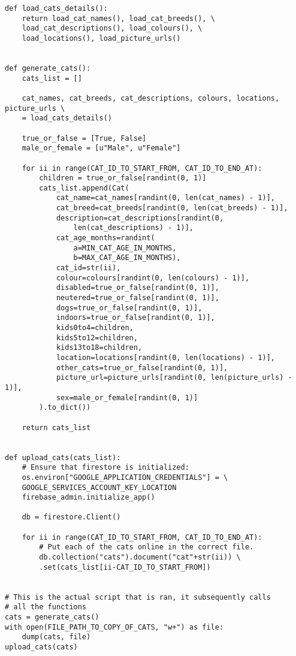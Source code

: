 \begin{verbatim}
def load_cats_details():
    return load_cat_names(), load_cat_breeds(), \
    load_cat_descriptions(), load_colours(), \
    load_locations(), load_picture_urls()


def generate_cats():
    cats_list = []

    cat_names, cat_breeds, cat_descriptions, colours, locations, picture_urls \
    = load_cats_details()

    true_or_false = [True, False]
    male_or_female = [u"Male", u"Female"]

    for ii in range(CAT_ID_TO_START_FROM, CAT_ID_TO_END_AT):
        children = true_or_false[randint(0, 1)]
        cats_list.append(Cat(
            cat_name=cat_names[randint(0, len(cat_names) - 1)],
            cat_breed=cat_breeds[randint(0, len(cat_breeds) - 1)],
            description=cat_descriptions[randint(0,
                len(cat_descriptions) - 1)],
            cat_age_months=randint(
                a=MIN_CAT_AGE_IN_MONTHS,
                b=MAX_CAT_AGE_IN_MONTHS),
            cat_id=str(ii),
            colour=colours[randint(0, len(colours) - 1)],
            disabled=true_or_false[randint(0, 1)],
            neutered=true_or_false[randint(0, 1)],
            dogs=true_or_false[randint(0, 1)],
            indoors=true_or_false[randint(0, 1)],
            kids0to4=children,
            kids5to12=children,
            kids13to18=children,
            location=locations[randint(0, len(locations) - 1)],
            other_cats=true_or_false[randint(0, 1)],
            picture_url=picture_urls[randint(0, len(picture_urls) - 1)],
            sex=male_or_female[randint(0, 1)]
        ).to_dict())

    return cats_list


def upload_cats(cats_list):
    # Ensure that firestore is initialized:
    os.environ["GOOGLE_APPLICATION_CREDENTIALS"] = \ 
    GOOGLE_SERVICES_ACCOUNT_KEY_LOCATION
    firebase_admin.initialize_app()

    db = firestore.Client()

    for ii in range(CAT_ID_TO_START_FROM, CAT_ID_TO_END_AT):
        # Put each of the cats online in the correct file.
        db.collection("cats").document("cat"+str(ii)) \
        .set(cats_list[ii-CAT_ID_TO_START_FROM])


# This is the actual script that is ran, it subsequently calls 
# all the functions
cats = generate_cats()
with open(FILE_PATH_TO_COPY_OF_CATS, "w+") as file:
    dump(cats, file)
upload_cats(cats)
\end{verbatim}

